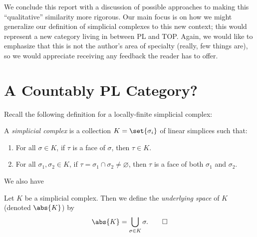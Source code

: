 We conclude this report with a discussion of possible approaches to
making this ``qualitative'' similarity more rigorous. Our main focus
is on how we might generalize our definition of simplicial complexes
to this new context; this would represent a new category living in
between PL and TOP. Again, we would like to emphasize that this is not
the author's area of specialty (really, few things are), so we would
appreciate receiving any feedback the reader has to offer.

\section{A Countably PL Category?}
Recall the following definition for a locally-finite simplicial
complex:

\begin{definition}
  A \emph{simplicial complex} is a collection $K = \set{\sigma_i}$
  of linear simplices such that:
  \begin{enumerate}
    \item For all $\sigma \in K$, if $\tau$ is a face of $\sigma$,
      then $\tau \in K$.
    \item For all $\sigma_1, \sigma_2 \in K$, if $\tau = \sigma_1
      \cap \sigma_2 \neq \varnothing$, then $\tau$ is a face of both
      $\sigma_1$ and $\sigma_2$. \qedhere
  \end{enumerate}
\end{definition}
We also have
\begin{definition}
  Let $K$ be a simplicial complex. Then we define the
  \emph{underlying space} of $K$ (denoted $\abs{K}$) by
  \[
    \abs{K} = \bigcup_{\sigma \in K} \sigma. \qedhere
  \]
\end{definition}
